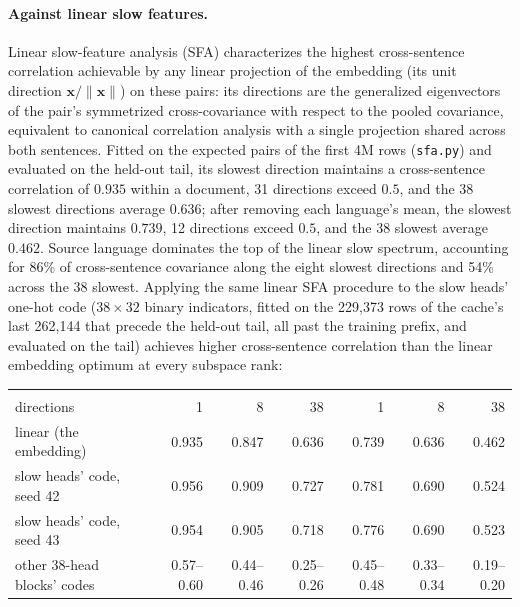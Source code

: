 \paragraph{Against linear slow features.}
Linear slow-feature analysis (SFA) characterizes the highest
cross-sentence correlation achievable by any linear projection of the
embedding (its unit direction $\mathbf{x}/\lVert\mathbf{x}\rVert$) on these pairs: its directions are the generalized eigenvectors
of the pair's symmetrized cross-covariance with respect to the pooled
covariance, equivalent to canonical correlation analysis with a single
projection shared across both sentences. Fitted on the expected pairs of
the first 4M rows (\texttt{sfa.py}) and evaluated on the held-out tail,
its slowest direction maintains a cross-sentence correlation of $0.935$
within a document, 31 directions exceed $0.5$, and the 38 slowest
directions average $0.636$; after removing each language's mean, the
slowest direction maintains $0.739$, 12 directions exceed $0.5$, and the
38 slowest average $0.462$. Source language dominates the top of the
linear slow spectrum, accounting for 86\% of cross-sentence covariance
along the eight slowest directions and 54\% across the 38 slowest.
Applying the same linear SFA procedure to the slow heads' one-hot code
($38\times32$ binary indicators, fitted on the 229{,}373 rows of the
cache's last 262{,}144 that precede the held-out tail, all past the
training prefix, and evaluated on the tail) achieves higher
cross-sentence correlation than the linear embedding optimum at every
subspace rank:

\begin{center}\small\setlength{\tabcolsep}{4pt}
\begin{tabular}{@{}lrrrrrr@{}}
\toprule
&  &  \\
\cmidrule(lr){2-4}\cmidrule(l){5-7}
directions & 1 & 8 & 38 & 1 & 8 & 38 \\
\midrule
linear (the embedding) & 0.935 & 0.847 & 0.636 & 0.739 & 0.636 & 0.462 \\
slow heads' code, seed 42 & 0.956 & 0.909 & 0.727 & 0.781 & 0.690 & 0.524 \\
slow heads' code, seed 43 & 0.954 & 0.905 & 0.718 & 0.776 & 0.690 & 0.523 \\
other 38-head blocks' codes & 0.57--0.60 & 0.44--0.46 & 0.25--0.26 & 0.45--0.48 & 0.33--0.34 & 0.19--0.20 \\
\bottomrule
\end{tabular}
\end{center}

